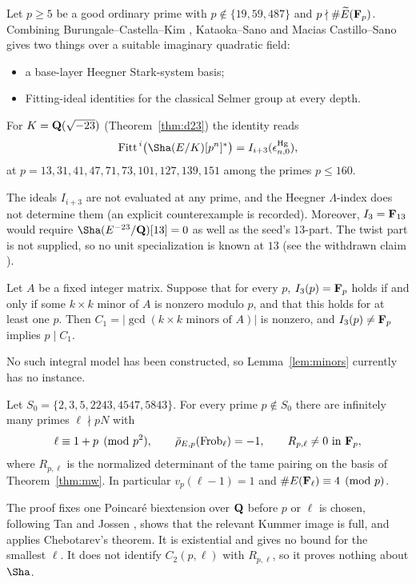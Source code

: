 \begin{researchrecord}\label{thm:mcs}
Let $p\ge5$ be a good ordinary prime with $p\notin\{19,59,487\}$ and $p\nmid\#\widetilde E(\mathbf{F}_p)$. Combining Burungale--Castella--Kim \cite{bck}, Kataoka--Sano and Macias Castillo--Sano \cite{mcs} gives two things over a suitable imaginary quadratic field:
\begin{itemize}[leftmargin=*]
\item a base-layer Heegner Stark-system basis;
\item Fitting-ideal identities for the classical Selmer group at every depth.
\end{itemize}
For $K=\mathbf{Q}(\sqrt{-23})$ (Theorem~\ref{thm:d23}) the identity reads
\[
\mathrm{Fitt}^{\,i}\bigl(\Sha(E/K)[p^n]^*\bigr)=I_{i+3}(\epsilon^{\mathrm{Hg}}_{n,0}),
\]
at $p=13,31,41,47,71,73,101,127,139,151$ among the primes $p\le160$.
\end{researchrecord}
The ideals $I_{i+3}$ are not evaluated at any prime, and the Heegner $\Lambda$-index does not determine them (an explicit counterexample is recorded). Moreover, $I_3=\mathbf{F}_{13}$ would require $\Sha(E^{-23}/\Q)[13]=0$ as well as the seed's $13$-part. The twist part is not supplied, so no unit specialization is known at $13$ (see the withdrawn claim ).

\begin{lemma}\label{lem:minors}
Let $A$ be a fixed integer matrix. Suppose that for every $p$, $I_3(p)=\mathbf{F}_p$ holds if and only if some $k\times k$ minor of $A$ is nonzero modulo $p$, and that this holds for at least one $p$. Then $C_1=|\gcd(\text{$k\times k$ minors of }A)|$ is nonzero, and $I_3(p)\ne\mathbf{F}_p$ implies $p\mid C_1$.
\end{lemma}
No such integral model has been constructed, so Lemma~\ref{lem:minors} currently has no instance.

\begin{researchrecord}\label{thm:g2}
Let $S_0=\{2,3,5,2243,4547,5843\}$. For every prime $p\notin S_0$ there are infinitely many primes $\ell\nmid pN$ with
\[
\ell\equiv1+p\pmod{p^2},\qquad \bar\rho_{E,p}(\mathrm{Frob}_\ell)=-1,\qquad R_{p,\ell}\ne0\ \text{in }\mathbf{F}_p ,
\]
where $R_{p,\ell}$ is the normalized determinant of the tame pairing on the basis of Theorem~\ref{thm:mw}. In particular $v_p(\ell-1)=1$ and $\#E(\mathbf{F}_\ell)\equiv4\pmod p$.
\end{researchrecord}
The proof fixes one Poincar\'e biextension over $\mathbf{Q}$ before $p$ or $\ell$ is chosen, following Tan \cite{tan} and Jossen \cite{jossen}, shows that the relevant Kummer image is full, and applies Chebotarev's theorem. It is existential and gives no bound for the smallest $\ell$. It does not identify $C_2(p,\ell)$ with $R_{p,\ell}$, so it proves nothing about $\Sha$.


